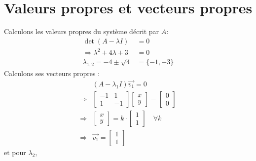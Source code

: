     \section{Valeurs propres et vecteurs propres}
        Calculons les valeurs propres du système décrit par $A$:
        \begin{equation}
            \begin{split}
            \det(A - \lambda I) &= 0 \\
            \Rightarrow \lambda^2 + 4\lambda + 3 &= 0\\
            \lambda_{1,2} = -4 \pm \sqrt{4} &= \{-1, -3\}
            \end{split}
        \end{equation}
        Calculons ses vecteurs propres :
        \begin{equation}
            \begin{split}
                &(A - \lambda_1 I)\overrightarrow{v_1} = 0 \\
                \Rightarrow& \begin{bmatrix} -1 & 1 \\ 1 & -1 \end{bmatrix} \begin{bmatrix} x \\ y \end{bmatrix} = \begin{bmatrix} 0 \\ 0 \end{bmatrix}\\
                \Rightarrow& \begin{bmatrix} x \\ y \end{bmatrix} = k \cdot \begin{bmatrix} 1 \\ 1 \end{bmatrix} \quad \forall k \\
                \Rightarrow& \overrightarrow{v_1} = \begin{bmatrix} 1 \\ 1 \end{bmatrix}
            \end{split}
        \end{equation}
        et pour $\lambda_2$,
